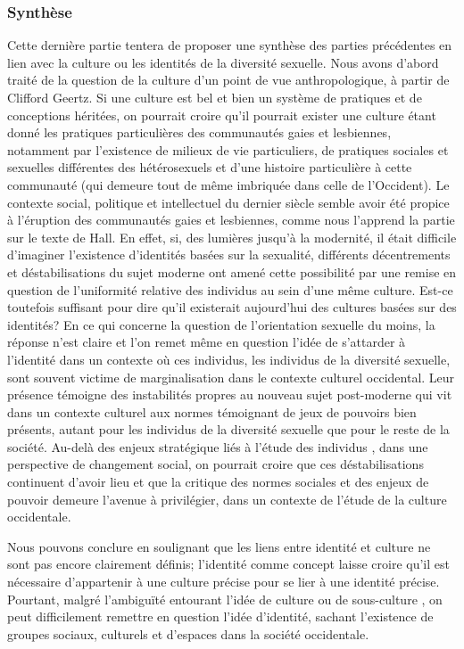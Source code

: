 \subsubsection{Synthèse}
\label{sec:synth_se} Cette dernière partie tentera de proposer une synthèse des parties précédentes en lien avec la culture ou les identités de la diversité sexuelle. 
Nous avons d'abord traité de la question de la culture d'un point de vue anthropologique, à partir de Clifford Geertz. 
Si une culture est bel et bien un système de pratiques et de conceptions héritées, on pourrait croire qu'il pourrait exister une culture \lgbt{} étant donné les pratiques particulières des communautés gaies et lesbiennes, notamment par l'existence de milieux de vie particuliers, de pratiques sociales et sexuelles différentes des hétérosexuels et d'une histoire particulière à cette communauté (qui demeure tout de même imbriquée dans celle de l'Occident). 
Le contexte social, politique et intellectuel du dernier siècle semble avoir été propice à l'éruption des communautés gaies et lesbiennes, comme nous l'apprend la partie sur le texte de Hall. 
En effet, si, des lumières jusqu'à la modernité, il était difficile d'imaginer l'existence d'identités basées sur la sexualité, différents décentrements et déstabilisations du sujet moderne ont amené cette possibilité par une remise en question de l'uniformité relative des individus au sein d'une même culture. 
Est-ce toutefois suffisant pour dire qu'il existerait aujourd'hui des cultures basées sur des identités? 
En ce qui concerne la question de l'orientation sexuelle du moins, la réponse n'est claire et l'on remet même en question l'idée de s'attarder à l'identité dans un contexte où ces individus, les individus de la diversité sexuelle, sont souvent victime de marginalisation dans le contexte culturel occidental. 
Leur présence témoigne des instabilités propres au nouveau sujet post-moderne qui vit dans un contexte culturel aux normes témoignant de jeux de pouvoirs bien présents, autant pour les individus de la diversité sexuelle que pour le reste de la société. 
Au-delà des enjeux stratégique liés à l'étude des individus \lgbt{}, dans une perspective de changement social, on pourrait croire que ces déstabilisations continuent d'avoir lieu et que la critique des normes sociales et des enjeux de pouvoir demeure l'avenue à privilégier, dans un contexte de l'étude de la culture occidentale.

Nous pouvons conclure en soulignant que les liens entre identité et culture ne sont pas encore clairement définis; l'identité comme concept laisse croire qu'il est nécessaire d'appartenir à une culture précise pour se lier à une identité précise. 
Pourtant, malgré l'ambiguïté entourant l'idée de culture ou de sous-culture \lgbt{}, on peut difficilement remettre en question l'idée d'identité, sachant l'existence de groupes sociaux, culturels et d'espaces \lgbt{} dans la société occidentale.

